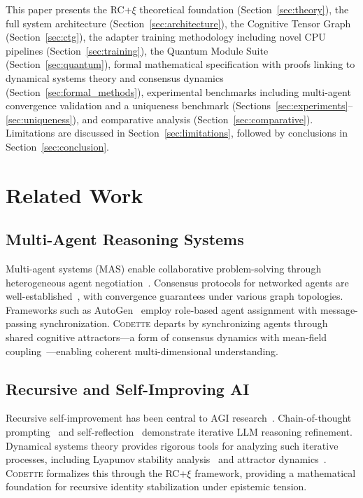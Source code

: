 \documentclass[11pt,a4paper]{article}
\newcommand{\rcxi}{RC+$\xi$}
\newcommand{\codette}{\textsc{Codette}}
\begin{document}
This paper presents the \rcxi{} theoretical foundation (Section~\ref{sec:theory}), the full system architecture (Section~\ref{sec:architecture}), the Cognitive Tensor Graph (Section~\ref{sec:ctg}), the adapter training methodology including novel CPU pipelines (Section~\ref{sec:training}), the Quantum Module Suite (Section~\ref{sec:quantum}), formal mathematical specification with proofs linking to dynamical systems theory and consensus dynamics (Section~\ref{sec:formal_methods}), experimental benchmarks including multi-agent convergence validation and a uniqueness benchmark (Sections~\ref{sec:experiments}--\ref{sec:uniqueness}), and comparative analysis (Section~\ref{sec:comparative}). Limitations are discussed in Section~\ref{sec:limitations}, followed by conclusions in Section~\ref{sec:conclusion}.

\section{Related Work}
\label{sec:related}

\subsection{Multi-Agent Reasoning Systems}
Multi-agent systems (MAS) enable collaborative problem-solving through heterogeneous agent negotiation~\citep{wooldridge2009introduction}. Consensus protocols for networked agents are well-established~\citep{olfatisaber2007consensus,ren2005consensus}, with convergence guarantees under various graph topologies. Frameworks such as AutoGen~\citep{wu2023autogen} employ role-based agent assignment with message-passing synchronization. \codette{} departs by synchronizing agents through shared cognitive attractors---a form of consensus dynamics with mean-field coupling~\citep{lasry2007mean}---enabling coherent multi-dimensional understanding.

\subsection{Recursive and Self-Improving AI}
Recursive self-improvement has been central to AGI research~\citep{good1966speculations}. Chain-of-thought prompting~\citep{wei2022chain} and self-reflection~\citep{shinn2023reflexion} demonstrate iterative LLM reasoning refinement. Dynamical systems theory provides rigorous tools for analyzing such iterative processes, including Lyapunov stability analysis~\citep{khalil2002nonlinear} and attractor dynamics~\citep{strogatz2015nonlinear}. \codette{} formalizes this through the \rcxi{} framework, providing a mathematical foundation for recursive identity stabilization under epistemic tension.
\end{document}
